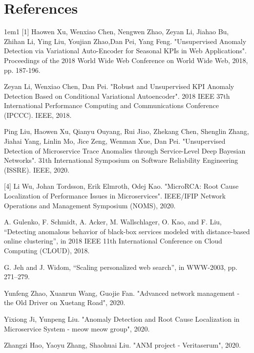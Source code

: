 \documentclass[12pt]{article}
\begin{document}
\section*{References}
\begin{hangparas}{1em}{1}
[1] Haowen Xu,  Wenxiao  Chen, Nengwen Zhao,  Zeyan  Li, Jiahao  Bu, Zhihan  Li,  Ying Liu,  Youjian Zhao,Dan  Pei, Yang Feng. "Unsupervised Anomaly Detection via Variational Auto-Encoder for Seasonal KPIs in Web Applications". Proceedings of the 2018 World Wide Web Conference on World Wide Web, 2018, pp. 187-196.

\smallskip\smallskip
[2] Zeyan Li, Wenxiao Chen, Dan Pei. "Robust and Unsupervised KPI Anomaly Detection Based on Conditional Variational Autoencoder". 2018 IEEE 37th International Performance Computing and Communications Conference (IPCCC). IEEE, 2018.

\smallskip\smallskip
[3] Ping Liu, Haowen Xu, Qianyu Ouyang, Rui Jiao, Zhekang Chen, Shenglin Zhang, Jiahai Yang, Linlin Mo, Jice Zeng, Wenman Xue, Dan Pei. "Unsupervised Detection of Microservice Trace Anomalies through Service-Level Deep Bayesian Networks". 31th International Symposium on Software Reliability Engineering (ISSRE). IEEE, 2020.


[4] Li Wu, Johan Tordsson, Erik Elmroth, Odej Kao. "MicroRCA: Root Cause Localization of Performance Issues in Microservices". IEEE/IFIP Network Operations and Management Symposium (NOMS), 2020. 

\smallskip\smallskip
[5] A. Gulenko, F. Schmidt, A. Acker, M. Wallschlager, O. Kao, and F. Liu, “Detecting anomalous behavior of black-box services modeled with distance-based online clustering”, in 2018 IEEE 11th International Conference on Cloud Computing (CLOUD), 2018.

\smallskip\smallskip
[6] G. Jeh and J. Widom, “Scaling personalized web search”, in WWW-2003, pp. 271–279.

\smallskip\smallskip
[7] Yunfeng Zhao, Xuanrun Wang, Guojie Fan. "Advanced network management - the Old Driver on Xuetang Road", 2020. 

\smallskip\smallskip
[8] Yixiong Ji, Yunpeng Liu. "Anomaly Detection and Root Cause Localization in Microservice System - meow meow group", 2020.

\smallskip\smallskip
[9] Zhangzi Hao, Yaoyu Zhang, Shaohuai Liu. "ANM project - Veritaserum", 2020. 

\vfill %
\break

\end{hangparas}
\end{document}
